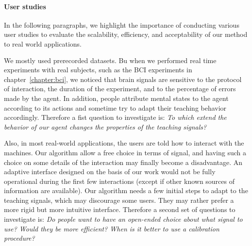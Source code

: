 \paragraph{User studies}


In the following paragraphs, we highlight the importance of conducting various user studies to evaluate the scalability, efficiency, and acceptability of our method to real world applications.


We mostly used prerecorded datasets. Bu when we performed real time experiments with real subjects, such as the BCI experiments in chapter~\ref{chapter:bci}, we noticed that brain signals are sensitive to the protocol of interaction, the duration of the experiment, and to the percentage of errors made by the agent. In addition, people attribute mental states to the agent according to its actions and sometime try to adapt their teaching behavior accordingly. Therefore a fist question to investigate is: \emph{To which extend the behavior of our agent changes the properties of the teaching signals?}


Also, in most real-world applications, the users are told how to interact with the machines. Our algorithm allow a free choice in terms of signal, and having such a choice on some details of the interaction may finally become a disadvantage. An adaptive interface designed on the basis of our work would not be fully operational during the first few interactions (except if other known sources of information are available). Our algorithm needs a few initial steps to adapt to the teaching signals, which may discourage some users. They may rather prefer a more rigid but more intuitive interface. Therefore a second set of questions to investigate is: \emph{Do people want to have an open-ended choice about what signal to use? Would they be more efficient? When is it better to use a calibration procedure?}

